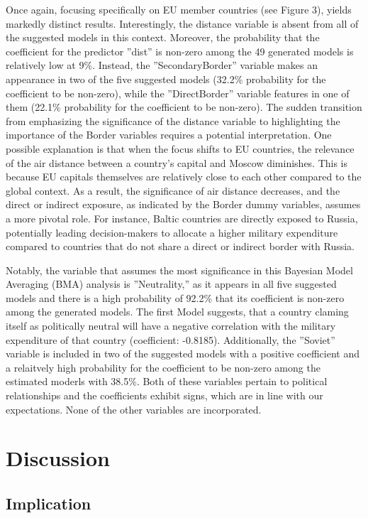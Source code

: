 \documentclass[12pt,a4paper]{article}
\begin{document}
Once again, focusing specifically on EU member countries (see Figure 3), yields markedly distinct results. Interestingly, the distance variable is absent from all of the suggested models in this context. Moreover, the probability that the coefficient for the predictor ''dist'' is non-zero among the 49 generated models is relatively low at 9\%. Instead, the ''SecondaryBorder'' variable makes an appearance in two of the five suggested models (32.2\% probability for the coefficient to be non-zero), while the ''DirectBorder'' variable features in one of them (22.1\% probability for the coefficient to be non-zero). The sudden transition from emphasizing the significance of the distance variable to highlighting the importance of the Border variables requires a potential interpretation. One possible explanation is that when the focus shifts to EU countries, the relevance of the air distance between a country's capital and Moscow diminishes. This is because EU capitals themselves are relatively close to each other compared to the global context. As a result, the significance of air distance decreases, and the direct or indirect exposure, as indicated by the Border dummy variables, assumes a more pivotal role. For instance, Baltic countries are directly exposed to Russia, potentially leading decision-makers to allocate a higher military expenditure compared to countries that do not share a direct or indirect border with Russia.

Notably, the variable that assumes the most significance in this Bayesian Model Averaging (BMA) analysis is ''Neutrality,'' as it appears in all five suggested models and there is a high probability of 92.2\% that its coefficient is non-zero among the generated models. The first Model suggests, that a country claming itself as politically neutral will have a negative correlation with the military expenditure of that country (coefficient: -0.8185). Additionally, the ''Soviet'' variable is included in two of the suggested models with a positive coefficient and a relaitvely high probability for the coefficient to be non-zero among the estimated moderls with 38.5\%.  Both of these variables pertain to political relationships and the coefficients exhibit signs, which are in line with our expectations. None of the other variables are incorporated.


\section{Discussion}
\subsection{Implication}
\end{document}
